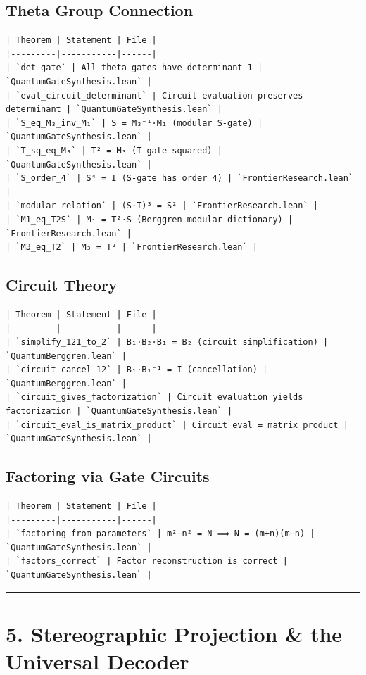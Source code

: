 \documentclass[12pt,a4paper,openany]{book}
\begin{document}
\subsection{Theta Group Connection}
\begin{verbatim}
| Theorem | Statement | File |
|---------|-----------|------|
| `det_gate` | All theta gates have determinant 1 | `QuantumGateSynthesis.lean` |
| `eval_circuit_determinant` | Circuit evaluation preserves determinant | `QuantumGateSynthesis.lean` |
| `S_eq_M₃_inv_M₁` | S = M₃⁻¹·M₁ (modular S-gate) | `QuantumGateSynthesis.lean` |
| `T_sq_eq_M₃` | T² = M₃ (T-gate squared) | `QuantumGateSynthesis.lean` |
| `S_order_4` | S⁴ = I (S-gate has order 4) | `FrontierResearch.lean` |
| `modular_relation` | (S·T)³ = S² | `FrontierResearch.lean` |
| `M1_eq_T2S` | M₁ = T²·S (Berggren-modular dictionary) | `FrontierResearch.lean` |
| `M3_eq_T2` | M₃ = T² | `FrontierResearch.lean` |
\end{verbatim}

\subsection{Circuit Theory}
\begin{verbatim}
| Theorem | Statement | File |
|---------|-----------|------|
| `simplify_121_to_2` | B₁·B₂·B₁ = B₂ (circuit simplification) | `QuantumBerggren.lean` |
| `circuit_cancel_12` | B₁·B₁⁻¹ = I (cancellation) | `QuantumBerggren.lean` |
| `circuit_gives_factorization` | Circuit evaluation yields factorization | `QuantumGateSynthesis.lean` |
| `circuit_eval_is_matrix_product` | Circuit eval = matrix product | `QuantumGateSynthesis.lean` |
\end{verbatim}

\subsection{Factoring via Gate Circuits}
\begin{verbatim}
| Theorem | Statement | File |
|---------|-----------|------|
| `factoring_from_parameters` | m²−n² = N ⟹ N = (m+n)(m−n) | `QuantumGateSynthesis.lean` |
| `factors_correct` | Factor reconstruction is correct | `QuantumGateSynthesis.lean` |
\end{verbatim}

\bigskip\hrule\bigskip

\section{5. Stereographic Projection \& the Universal Decoder}
\end{document}
